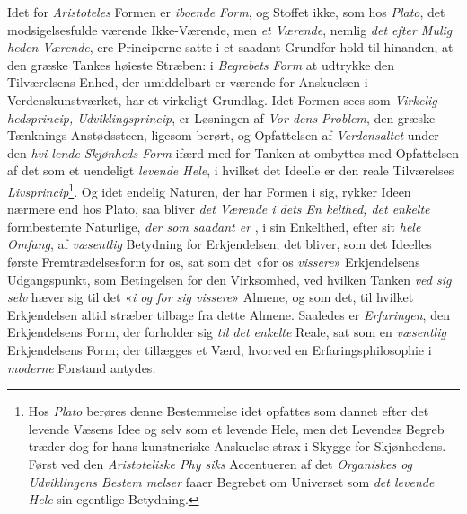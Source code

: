 Idet for \emph{Aristoteles} Formen er \emph{iboende Form}, og
Stoffet ikke, som hos \emph{Plato}, det modsigelsesfulde værende
Ikke-Værende, men \emph{et Værende}, nemlig \emph{det efter Mulig\-%
heden Værende}, ere Principerne satte i et saadant Grundfor\-%
hold til hinanden, at den græske Tankes høieste Stræben: i
\emph{Begrebets Form} at udtrykke den Tilværelsens Enhed, der
umiddelbart er værende for Anskuelsen i Verdenskunstværket,
har et virkeligt Grundlag. Idet Formen sees som \emph{Virkelig\-%
hedsprincip, Udviklingsprincip}, er Løsningen af \emph{Vor\-%
dens Problem}, den græske Tænknings Anstødssteen, ligesom
berørt, og Opfattelsen af \emph{Verdensaltet} under den \emph{hvi\-%
lende Skjønheds Form} ifærd med for Tanken at ombyttes
med Opfattelsen af det som et uendeligt \emph{levende Hele}, i
hvilket det Ideelle er den reale Tilværelses \emph{Livsprincip}\footnote{Hos
\emph{Plato} berøres denne Bestemmelse idet  opfattes som
dannet efter det levende Væsens Idee og selv som et levende Hele,
men det Levendes Begreb træder dog for hans kunstneriske Anskuelse
strax i Skygge for Skjønhedens. Først ved den \emph{Aristoteliske Phy\-%
siks} Accentueren af det \emph{Organiskes og Udviklingens Bestem\-%
melser} faaer Begrebet om Universet som \emph{det levende Hele} sin
egentlige Betydning.}.
Og idet endelig Naturen, der har Formen i sig, rykker Ideen
nærmere end hos Plato, saa bliver \emph{det Værende i dets En\-%
kelthed, det enkelte} formbestemte Naturlige, \emph{der som
saadant er} , i sin Enkelthed, efter sit \emph{hele Omfang}, af
\emph{væsentlig} Betydning for Erkjendelsen; det bliver, som det
Ideelles første Fremtrædelsesform for os, sat som det «for os
\emph{vissere}» Erkjendelsens Udgangspunkt, som Betingelsen for
den Virksomhed, ved hvilken Tanken \emph{ved sig selv} hæver sig
til det «\emph{i og for sig vissere}» Almene, og som det, til hvilket
Erkjendelsen altid stræber tilbage fra dette Almene. Saaledes
er \emph{Erfaringen}, den Erkjendelsens Form, der forholder sig
\emph{til det enkelte} Reale, sat som en \emph{væsentlig} Erkjendelsens
Form; der tillægges et Værd, hvorved en Erfaringsphilosophie
i \emph{moderne} Forstand antydes.

